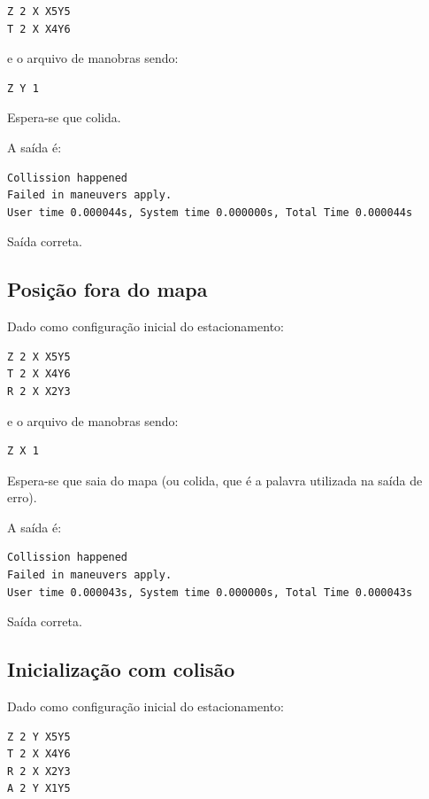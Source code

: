 \documentclass[11pt]{article}
\begin{document}
\begin{verbatim}
Z 2 X X5Y5
T 2 X X4Y6
\end{verbatim}

e o arquivo de manobras sendo:

\begin{verbatim}
Z Y 1
\end{verbatim}

Espera-se que colida.

A saída é:

\begin{verbatim}
Collission happened
Failed in maneuvers apply.
User time 0.000044s, System time 0.000000s, Total Time 0.000044s
\end{verbatim}


Saída correta.

\subsection{Posição fora do mapa}
\label{sec:org8778b4b}
Dado como configuração inicial do estacionamento:

\begin{verbatim}
Z 2 X X5Y5
T 2 X X4Y6
R 2 X X2Y3
\end{verbatim}



e o arquivo de manobras sendo:

\begin{verbatim}
Z X 1
\end{verbatim}

Espera-se que saia do mapa (ou colida, que é a palavra utilizada na saída de erro).

A saída é:

\begin{verbatim}
Collission happened
Failed in maneuvers apply.
User time 0.000043s, System time 0.000000s, Total Time 0.000043s
\end{verbatim}


Saída correta.

\subsection{Inicialização com colisão}
\label{sec:orgbed04cd}
Dado como configuração inicial do estacionamento:

\begin{verbatim}
Z 2 Y X5Y5
T 2 X X4Y6
R 2 X X2Y3
A 2 Y X1Y5
\end{verbatim}
\end{document}
